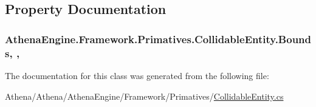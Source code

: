 \subsection{Property Documentation}
\hypertarget{class_athena_engine_1_1_framework_1_1_primatives_1_1_collidable_entity_ae53970f6a2236ffa67eeb34146b3447c}{
\subsubsection[{Bounds}]{ Athena\-Engine.\-Framework.\-Primatives.\-Collidable\-Entity.\-Bounds\hspace{0.3cm}{\ttfamily [get]}, {\ttfamily [set]}, {\ttfamily [protected]}}}\label{class_athena_engine_1_1_framework_1_1_primatives_1_1_collidable_entity_ae53970f6a2236ffa67eeb34146b3447c}


The documentation for this class was generated from the following file\-:\begin{DoxyCompactItemize}
\item 
Athena/\-Athena/\-Athena\-Engine/\-Framework/\-Primatives/\hyperlink{_collidable_entity_8cs}{Collidable\-Entity.\-cs}\end{DoxyCompactItemize}
